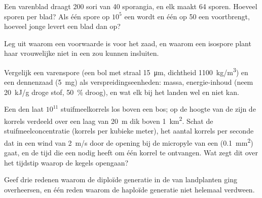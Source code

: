 \begin{exercise}[$\star\star$]\label{exo:b2:plant-life-cycles:7}
Een varenblad draagt \num{200} sori van \num{40} sporangia, en elk
 maakt \num{64} sporen. Hoeveel sporen per blad? Als
één spore op $10^{5}$ een  wordt en één  op
\num{50} een  voortbrengt, hoeveel jonge  levert een blad
dan op?
\end{exercise}

\begin{exercise}[$\star\star$]\label{exo:b2:plant-life-cycles:8}
Leg uit waarom  een voorwaarde is voor het zaad, en waarom
een isospore plant haar vrouwelijke  niet in een 
zou kunnen insluiten.
\end{exercise}

\begin{exercise}[$\star\star$]\label{exo:b2:plant-life-cycles:9}
Vergelijk een varenspore (een bol met straal \qty{15}{\micro m}, dichtheid
\qty{1100}{kg/m^3}) en een dennenzaad (\qty{5}{mg}) als
verspreidingseenheden: massa, energie-inhoud (neem \qty{20}{kJ/g} droge
stof, \qty{50}{\%} droog), en wat elk bij het landen wel en niet kan.
\end{exercise}

\begin{exercise}[$\star\star\star$]\label{exo:b2:plant-life-cycles:10}
Een den laat $10^{11}$ stuifmeelkorrels los boven een bos; op de hoogte
van de  zijn de korrels verdeeld over een laag van
\qty{20}{m} dik boven \qty{1}{km^2}. Schat de stuifmeelconcentratie
(korrels per kubieke meter), het aantal korrels per seconde dat in een
wind van \qty{2}{m/s} door de opening bij de micropyle van een
 (\qty{0.1}{mm^2}) gaat, en de tijd die een 
nodig heeft om één korrel te ontvangen. Wat zegt dit over het tijdstip
waarop de kegels opengaan?
\end{exercise}

\begin{exercise}[$\star\star\star$]\label{exo:b2:plant-life-cycles:11}
Geef drie redenen waarom de diploïde generatie in de  van
landplanten ging overheersen, en één reden waarom de haploïde generatie
niet helemaal verdween.
\end{exercise}

